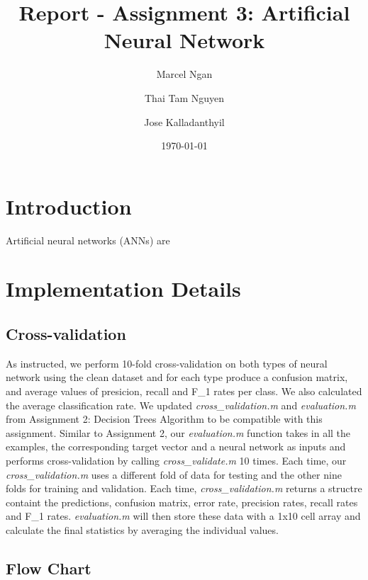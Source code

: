 \documentclass[a4wide, 11pt]{article}
\begin{document}
\title{Report - Assignment 3: Artificial Neural Network}

\author{Marcel Ngan \and Thai Tam Nguyen \and Jose Kalladanthyil}

\date{\today}         %

\maketitle            %

\section{Introduction}
Artificial neural networks (ANNs) are 


\section{Implementation Details}

\subsection{Cross-validation}
As instructed, we perform 10-fold cross-validation on both types of neural network using the clean dataset and for each type produce a confusion matrix, and average values of presicion, recall and F_{1} rates per class.  We also calculated the average classification rate.  We updated \textit{cross_validation.m} and \textit{evaluation.m} from Assignment 2: Decision Trees Algorithm to be compatible with this assignment.  Similar to Assignment 2, our \textit{evaluation.m} function takes in all the examples, the corresponding target vector and a neural network as inputs and performs cross-validation by calling \textit{cross_validate.m}  10 times.  Each time, our \textit{cross_validation.m} uses a different fold of data for testing and the other nine folds for training and validation.  Each time,  \textit{cross_validation.m} returns a structre containt the predictions, confusion matrix, error rate, precision rates, recall rates and F_{1} rates.   \textit{evaluation.m} will then store these data with a 1x10 cell array and calculate the final statistics by averaging the individual values.  

\subsection{Flow Chart}
\end{document}
